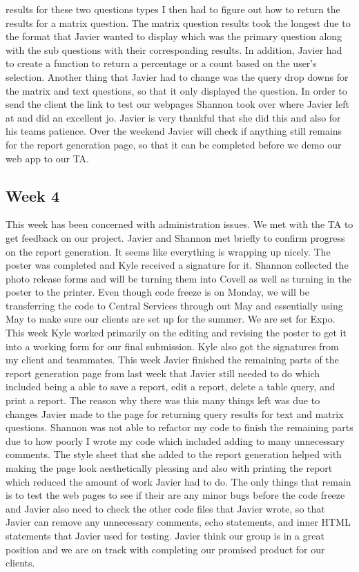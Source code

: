 \documentclass[letterpaper,10pt,serif,draftclsnofoot,onecolumn,compsoc,titlepage]{IEEEtran}
\begin{document}
 results for these two questions types I then had to figure out how to return the results for a matrix question.
 The matrix question results took the longest due to the format that Javier wanted to display which was the primary
 question along with the sub questions with their corresponding results. In addition, Javier had to create a function
 to return a percentage or a count based on the user's selection. Another thing that Javier had to change was the query
 drop downs for the matrix and text questions, so that it only displayed the question. In order to send the client
 the link to test our webpages Shannon took over where Javier left at and did an excellent jo. Javier is very thankful
 that she did this and also for his teams patience. Over the weekend Javier will check if anything still remains
 for the report generation page, so that it can be completed before we demo our web app to our TA.
\subsection{Week 4}
This week has been concerned with administration issues. We met with the TA to get feedback on our project.
 Javier and Shannon met briefly to confirm progress on the report generation. It seems like everything is
 wrapping up nicely. The poster was completed and Kyle received a signature for it. Shannon collected the photo
 release forms and will be turning them into Covell as well as turning in the poster to the printer.
 Even though code freeze is on Monday, we will be transferring the code to Central Services through out
 May and essentially using May to make sure our clients are set up for the summer. We are set for Expo.
 This week Kyle worked primarily on the editing and revising the poster to get it into a working form for
 our final submission. Kyle also got the signatures from my client and teammates.
 This week Javier finished the remaining parts of the report generation page from last week that Javier
 still needed to do which included being a able to save a report, edit a report, delete a table query,
 and print a report. The reason why there was this many things left was due to changes Javier made to the
 page for returning query results for text and matrix questions. Shannon was not able to refactor my code
 to finish the remaining parts due to how poorly I wrote my code which included adding to many unnecessary
 comments. The style sheet that she added to the report generation helped with making the page look
 aesthetically pleasing and also with printing the report which reduced the amount of work Javier had to do.
 The only things that remain is to test the web pages to see if their are any minor bugs before the code
 freeze and Javier also need to check the other code files that Javier wrote, so that Javier can remove
 any unnecessary comments, echo statements, and inner HTML statements that Javier used for testing. Javier
 think our group is in a great position and we are on track with completing our promised product for our clients.
\end{document}
